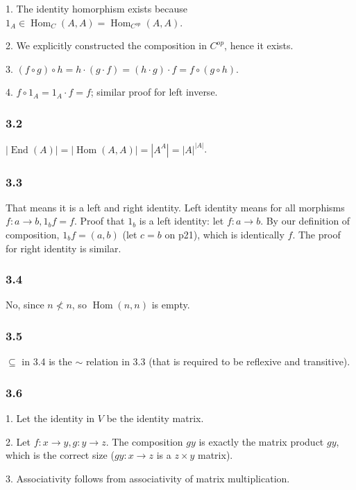 \documentclass{article}
\DeclareMathOperator{\Hom}{Hom}
\DeclareMathOperator{\End}{End}
\begin{document}
1. The identity homorphism exists because $1_A \in \Hom_C(A, A) = \Hom_{C^{op}}(A, A)$.

2. We explicitly constructed the composition in $C^{op}$, hence it exists.

3. $(f \circ g) \circ h = h \cdot (g \cdot f) = (h \cdot g) \cdot f = f \circ (g \circ h)$.

4. $f \circ 1_A = 1_A \cdot f = f$; similar proof for left inverse.

\subsubsection*{3.2}

$|\End(A)| = |\Hom(A, A)| = |A^A| = |A|^{|A|}$.

\subsubsection*{3.3}

That means it is a left and right identity. Left identity means for all morphisms $f: a \to b, 1_bf = f$. Proof that $1_b$ is a left identity: let $f: a \to b$. By our definition of composition, $1_bf = (a, b)$ (let $c = b$ on p21), which is identically $f$. The proof for right identity is similar.

\subsubsection*{3.4}

No, since $n \not< n$, so $\Hom(n, n)$ is empty.

\subsubsection*{3.5}

$\subseteq$ in 3.4 is the $\sim$ relation in 3.3 (that is required to be reflexive and transitive).

\subsubsection*{3.6}

1. Let the identity in $V$ be the identity matrix.

2. Let $f: x \to y, g: y \to z$. The composition $gy$ is exactly the matrix product $gy$, which is the correct size ($gy: x \to z$ is a $z \times y$ matrix).

3. Associativity follows from associativity of matrix multiplication.
\end{document}
